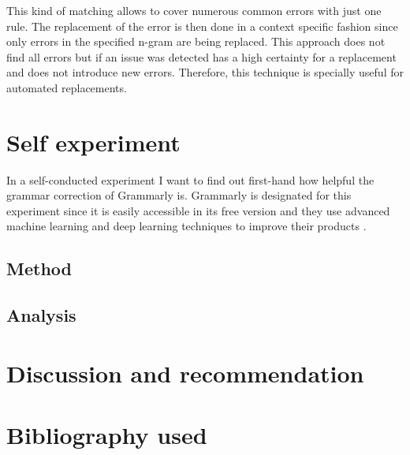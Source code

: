 \documentclass[runningheads]{llncs}
\let\OldTextregistered\textregistered
\renewcommand{\textregistered}{\OldTextregistered\xspace}%
\begin{document}
This kind of matching allows to cover numerous common errors with just one rule. The replacement of the error is then done in a context specific fashion since only errors in the specified n-gram are being replaced. This approach does not find all errors but if an issue was detected has a high certainty for a replacement and does not introduce new errors. Therefore, this technique is specially useful for automated replacements.


\section{Self experiment}
In a self-conducted experiment I want to find out first-hand how helpful the grammar correction of Grammarly\textregistered is. Grammarly\textregistered is designated for this experiment since it is easily accessible in its free version and they use advanced machine learning and deep learning techniques to improve their products \citep{noauthor_write_nodate}.

\subsection{Method}

\subsection{Analysis}

\section{Discussion and recommendation}



\section{Bibliography used}

\printbibliography
\end{document}
